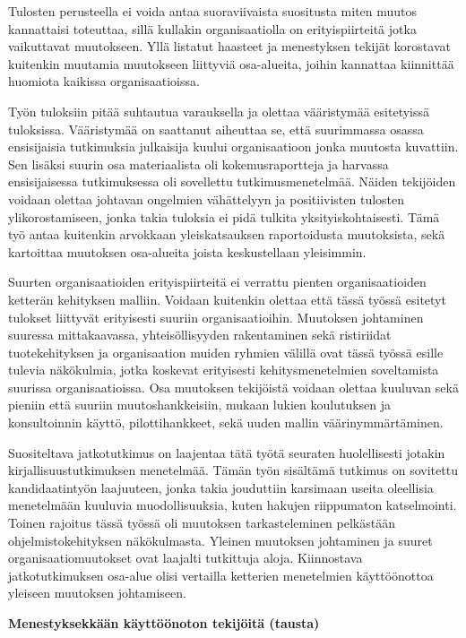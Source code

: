 Tulosten perusteella ei voida antaa suoraviivaista suositusta miten muutos
kannattaisi toteuttaa, sillä kullakin organisaatiolla on erityispiirteitä jotka
vaikuttavat muutokseen. Yllä listatut haasteet ja menestyksen tekijät korostavat
kuitenkin muutamia muutokseen liittyviä osa-alueita, joihin kannattaa kiinnittää
huomiota kaikissa organisaatioissa.

Työn tuloksiin pitää suhtautua varauksella ja olettaa vääristymää esitetyissä
tuloksissa. Vääristymää on saattanut aiheuttaa se, että suurimmassa osassa
ensisijaisia tutkimuksia julkaisija kuului organisaatioon jonka muutosta
kuvattiin. Sen lisäksi suurin osa materiaalista oli kokemusraportteja ja
harvassa ensisijaisessa tutkimuksessa oli sovellettu tutkimusmenetelmää. Näiden
tekijöiden voidaan olettaa johtavan ongelmien vähättelyyn ja positiivisten
tulosten ylikorostamiseen, jonka takia tuloksia ei pidä tulkita
yksityiskohtaisesti. Tämä työ antaa kuitenkin arvokkaan yleiskatsauksen
raportoidusta muutoksista, sekä kartoittaa muutoksen osa-alueita joista
keskustellaan yleisimmin.

Suurten organisaatioiden erityispiirteitä ei verrattu pienten organisaatioiden
ketterän kehityksen malliin. Voidaan kuitenkin olettaa että tässä työssä
esitetyt tulokset liittyvät erityisesti suuriin organisaatioihin. Muutoksen
johtaminen suuressa mittakaavassa, yhteisöllisyyden rakentaminen sekä
ristiriidat tuotekehityksen ja organisaation muiden ryhmien välillä ovat tässä
työssä esille tulevia näkökulmia, jotka koskevat erityisesti kehitysmenetelmien
soveltamista suurissa organisaatioissa. Osa muutoksen tekijöistä voidaan olettaa
kuuluvan sekä pieniin että suuriin muutoshankkeisiin, mukaan lukien koulutuksen
ja konsultoinnin käyttö, pilottihankkeet, sekä uuden mallin väärinymmärtäminen.

Suositeltava jatkotutkimus on laajentaa tätä työtä seuraten huolellisesti
jotakin kirjallisuustutkimuksen menetelmää. Tämän työn sisältämä tutkimus on
sovitettu kandidaatintyön laajuuteen, jonka takia jouduttiin karsimaan useita
oleellisia menetelmään kuuluvia muodollisuuksia, kuten hakujen riippumaton
katselmointi. Toinen rajoitus tässä työssä oli muutoksen tarkasteleminen
pelkästään ohjelmistokehityksen näkökulmasta. Yleinen muutoksen johtaminen ja
suuret organisaatiomuutokset ovat laajalti tutkittuja aloja. Kiinnostava
jatkotutkimuksen osa-alue olisi vertailla ketterien menetelmien käyttöönottoa
yleiseen muutoksen johtamiseen.


\clearpage
\large
\textbf{Menestyksekkään käyttöönoton tekijöitä (tausta)}
\normalsize

